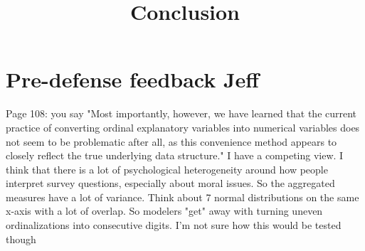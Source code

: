 \documentclass[12pt]{article}
\title{Conclusion}
\date{}
\begin{document}
\maketitle

\section*{Pre-defense feedback Jeff}
	\begin{coi}
		\item Page 108: you say "Most importantly, however, we have learned that the current practice of converting ordinal explanatory variables into numerical variables does not seem to be problematic after all, as this convenience method appears to closely reflect the true underlying data structure." I have a competing view. I think that there is a lot of psychological heterogeneity around how people interpret survey questions, especially about moral issues. So the aggregated measures have a lot of variance. Think about 7 normal distributions on the same x-axis with a lot of overlap. So modelers "get" away with turning uneven ordinalizations into consecutive digits. I'm not sure how this would be tested though
	\end{coi}
\end{document}

